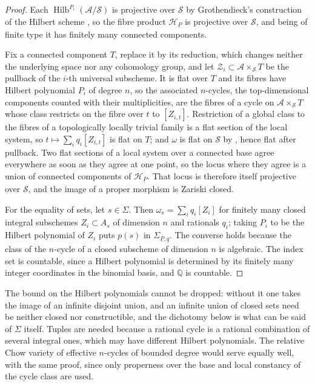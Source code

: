 \documentclass[11pt,reqno]{amsart}
\theoremstyle{plain}
\theoremstyle{definition}
\theoremstyle{remark}
\newcommand{\QQ}{\mathbb{Q}}
\newcommand{\cH}{\mathcal{H}}
\newcommand{\cA}{\mathcal{A}}
\newcommand{\cS}{\mathcal{S}}
\newcommand{\cZ}{\mathcal{Z}}
\DeclareMathOperator{\Hilb}{Hilb}
\begin{document}
\begin{proof}
Each $\Hilb^{P_{i}}(\cA/\cS)$ is projective over $\cS$ by Grothendieck's
construction of the Hilbert scheme \cite{Gro61}, so the fibre product
$\cH_{\underline{P}}$ is
projective over $\cS$, and being of finite type it has finitely many connected
components.

Fix a connected component $T$, replace it by its reduction, which changes
neither the underlying space nor any cohomology group, and let
$\cZ_{i}\subset\cA\times_{\cS}T$ be the pullback of the $i$-th universal
subscheme. It is flat over $T$ and its fibres have Hilbert polynomial $P_{i}$
of degree $n$, so the associated $n$-cycles, the top-dimensional components
counted with their multiplicities, are the fibres of a cycle on
$\cA\times_{\cS}T$ whose class restricts on the fibre over $t$ to $[Z_{i,t}]$.
Restriction of a global class to the fibres of a topologically
locally trivial family is a flat section of the local system, so
$t\mapsto\sum_{i}q_{i}[Z_{i,t}]$ is flat on $T$; and $\omega$ is flat on $\cS$
by , hence flat after pullback. Two flat sections of a
local system over a connected base agree everywhere as soon as they agree at
one point, so the locus where they agree is a union of connected components of
$\cH_{\underline{P}}$. That locus is therefore itself projective over $\cS$,
and the image of a proper morphism is Zariski closed.

For the equality of sets, let $s\in\Sigma$. Then
$\omega_{s}=\sum_{i}q_{i}[Z_{i}]$ for finitely many closed integral subschemes
$Z_{i}\subset A_{s}$ of dimension $n$ and rationals $q_{i}$; taking
$P_{i}$ to be the Hilbert polynomial of $Z_{i}$ puts $p(s)$ in
$\Sigma_{\underline{P},\underline{q}}$. The converse holds because the class
of the $n$-cycle of a closed subscheme of dimension $n$ is algebraic. The
index set is countable, since a Hilbert polynomial is determined by its
finitely many integer coordinates in the binomial basis, and $\QQ$ is
countable.
\end{proof}

The bound on the Hilbert polynomials cannot be dropped: without it one takes
the image of an infinite disjoint union, and an infinite union of closed sets
need be neither closed nor constructible, and the dichotomy below is what
can be said of $\Sigma$ itself. Tuples are needed because a rational cycle is a rational combination
of several integral ones, which may have different Hilbert polynomials. The
relative Chow variety of effective $n$-cycles of bounded degree would serve
equally well, with the same proof, since only properness over the base and
local constancy of the cycle class are used.
\end{document}
